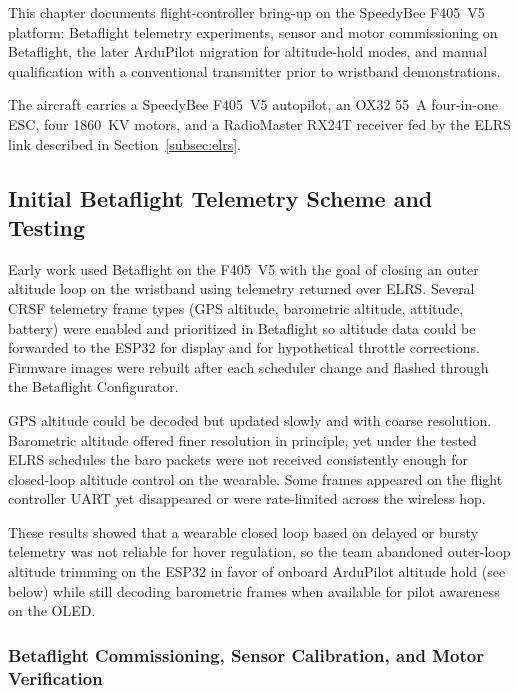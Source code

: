 This chapter documents flight-controller bring-up on the SpeedyBee F405~V5 platform: Betaflight
telemetry experiments, sensor and motor commissioning on Betaflight, the later ArduPilot migration
for altitude-hold modes, and manual qualification with a conventional transmitter prior to wristband
demonstrations.

The aircraft carries a SpeedyBee F405~V5 autopilot, an OX32 55~A four-in-one ESC, four 1860~KV
motors, and a RadioMaster RX24T receiver fed by the ELRS link described in Section~\ref{subsec:elrs}.

\subsection{Initial Betaflight Telemetry Scheme and Testing}

Early work used Betaflight on the F405~V5 with the goal of closing an outer altitude loop on the
wristband using telemetry returned over ELRS\@.
Several CRSF telemetry frame types (GPS altitude, barometric altitude, attitude, battery) were
enabled and prioritized in Betaflight so altitude data could be forwarded to the ESP32 for display
and for hypothetical throttle corrections.
Firmware images were rebuilt after each scheduler change and flashed through the Betaflight
Configurator.

GPS altitude could be decoded but updated slowly and with coarse resolution.
Barometric altitude offered finer resolution in principle, yet under the tested ELRS schedules the
baro packets were not received consistently enough for closed-loop altitude control on the wearable.
Some frames appeared on the flight controller UART yet disappeared or were rate-limited across the
wireless hop.

These results showed that a wearable closed loop based on delayed or bursty telemetry was not
reliable for hover regulation, so the team abandoned outer-loop altitude trimming on the ESP32 in
favor of onboard ArduPilot altitude hold (see below) while still decoding barometric frames when available for
pilot awareness on the OLED.

\subsubsection{Betaflight Commissioning, Sensor Calibration, and Motor Verification}

